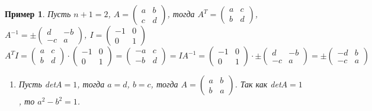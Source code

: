 \documentclass[12pt]{article}
\theoremstyle{plain}
\newtheorem{example}{Пример}
\begin{document}
    \begin{example}
        Пусть $n+1=2$, $A=\begin{pmatrix}
            a & b\\
            c & d
        \end{pmatrix}$, тогда $A^{T}=\begin{pmatrix}
            a & c\\
            b & d
        \end{pmatrix}$, $A^{-1}=\pm\begin{pmatrix}
            d & -b\\
            -c & a
        \end{pmatrix}$, $I=\begin{pmatrix}
            -1 & 0\\
            0 & 1
        \end{pmatrix}$
        $$A^TI=\begin{pmatrix}
            a & c\\
            b & d
        \end{pmatrix}\cdot\begin{pmatrix}
            -1 & 0\\
            0 & 1
        \end{pmatrix}=\begin{pmatrix}
            -a & c\\
            -b & d
        \end{pmatrix}=IA^{-1}=\begin{pmatrix}
            -1 & 0\\
            0 & 1
        \end{pmatrix}\cdot\pm\begin{pmatrix}
            d & -b\\
            -c & a
        \end{pmatrix}=\pm\begin{pmatrix}
            -d & b\\
            -c & a
        \end{pmatrix}$$
        \begin{enumerate}
            \item Пусть det$A=1$, тогда $a=d$, $b=c$, тогда $A=\begin{pmatrix}
                a & b\\
                b & a
            \end{pmatrix}$. Так как det$A=1$, то $a^2-b^2=1$.
            \begin{enumerate}

\end{enumerate}
\end{enumerate}
\end{example}
\end{document}
